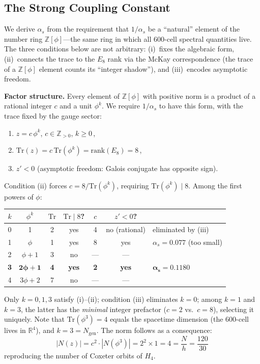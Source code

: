 \documentclass[12pt,a4paper]{article}
\theoremstyle{definition}
\begin{document}
\subsection{The Strong Coupling Constant}

We derive $\alpha_s$ from the requirement that $1/\alpha_s$ be a ``natural'' element of the number ring $\mathbb{Z}[\phi]$---the same ring in which all 600-cell spectral quantities live.  The three conditions below are not arbitrary: (i)~fixes the algebraic form, (ii)~connects the trace to the $E_8$ rank via the McKay correspondence (the trace of a $\mathbb{Z}[\phi]$ element counts its ``integer shadow''), and (iii)~encodes asymptotic freedom.

\textbf{Factor structure.}  Every element of $\mathbb{Z}[\phi]$ with positive norm is a product of a rational integer $c$ and a unit $\phi^k$.  We require $1/\alpha_s$ to have this form, with the trace fixed by the gauge sector:
\begin{enumerate}
\item[(i)] $z = c\,\phi^k$, \;$c \in \mathbb{Z}_{>0}$, \;$k \geq 0$\,,
\item[(ii)] $\mathrm{Tr}(z) = c\,\mathrm{Tr}(\phi^k) = \mathrm{rank}(E_8) = 8$\,,
\item[(iii)] $z' < 0$ \;(asymptotic freedom: Galois conjugate has opposite sign).
\end{enumerate}
Condition (ii) forces $c = 8/\text{Tr}(\phi^k)$, requiring $\text{Tr}(\phi^k) \mid 8$.  Among the first powers of $\phi$:
\begin{center}
\begin{tabular}{ccccccl}
\toprule
$k$ & $\phi^k$ & $\text{Tr}$ & $\text{Tr} \mid 8$? & $c$ & $z'<0$? & \\
\midrule
0 & 1         & 2 & yes & 4 & no (rational) & eliminated by (iii) \\
1 & $\phi$    & 1 & yes & 8 & yes & $\alpha_s = 0.077$ (too small) \\
2 & $\phi+1$  & 3 & no  & --- & --- & \\
\textbf{3} & $\boldsymbol{2\phi+1}$  & \textbf{4} & \textbf{yes} & \textbf{2} & \textbf{yes} & $\boldsymbol{\alpha_s = 0.1180}$ \\
4 & $3\phi+2$ & 7 & no  & --- & --- & \\
\bottomrule
\end{tabular}
\end{center}
Only $k = 0, 1, 3$ satisfy (i)--(ii); condition (iii) eliminates $k=0$; among $k=1$ and $k=3$, the latter has the \emph{minimal} integer prefactor ($c = 2$ vs.\ $c = 8$), selecting it uniquely.  Note that $\text{Tr}(\phi^3) = 4$ equals the spacetime dimension (the 600-cell lives in $\mathbb{R}^4$), and $k = 3 = N_{\text{gen}}$.  The norm follows as a consequence:
\begin{equation}
|N(z)| = c^2 \cdot |N(\phi^3)| = 2^2 \times 1 = 4 = \frac{N}{h} = \frac{120}{30}
\end{equation}
reproducing the number of Coxeter orbits of $H_4$.
\end{document}
